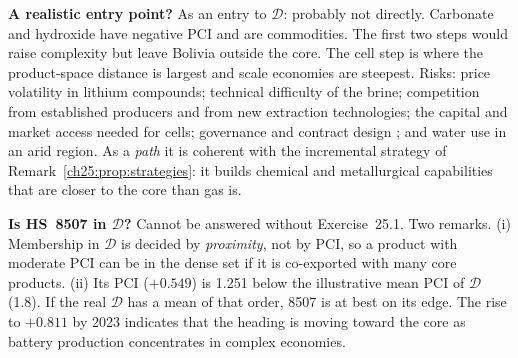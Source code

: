 \documentclass[../solutions_manual.tex]{subfiles}
\begin{document}
 \textbf{A realistic entry point?} As an entry to $\mathcal{D}$: probably not directly. Carbonate and hydroxide have negative PCI and are commodities. The first two steps would raise complexity but leave Bolivia outside the core. The cell step is where the product-space distance is largest and scale economies are steepest. Risks: price volatility in lithium compounds; technical difficulty of the brine; competition from established producers and from new extraction technologies; the capital and market access needed for cells; governance and contract design \citep{obaya2019estudio}; and water use in an arid region. As a \emph{path} it is coherent with the incremental strategy of Remark~\ref{ch25:prop:strategies}: it builds chemical and metallurgical capabilities that are closer to the core than gas is.

 \textbf{Is HS~8507 in $\mathcal{D}$?} Cannot be answered without Exercise~25.1. Two remarks. (i) Membership in $\mathcal{D}$ is decided by \emph{proximity}, not by PCI, so a product with moderate PCI can be in the dense set if it is co-exported with many core products. (ii) Its PCI ($+0.549$) is 1.251 below the illustrative mean PCI of $\mathcal{D}$ (1.8). If the real $\mathcal{D}$ has a mean of that order, 8507 is at best on its edge. The rise to $+0.811$ by 2023 indicates that the heading is moving toward the core as battery production concentrates in complex economies.

\endgroup
\end{document}
